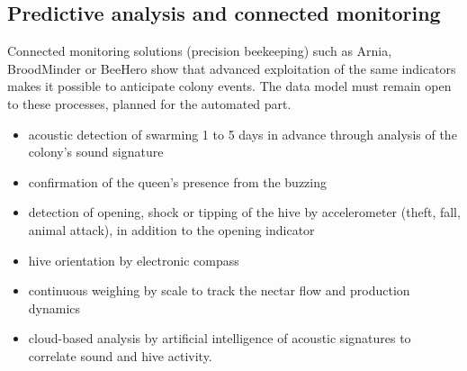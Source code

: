 \subsection{Predictive analysis and connected monitoring}
Connected monitoring solutions (precision beekeeping) such as Arnia,
BroodMinder or BeeHero show that advanced exploitation of the same indicators
makes it possible to anticipate colony events. The data model must remain open
to these processes, planned for the automated part.
\begin{itemize}
  \item acoustic detection of swarming 1 to 5 days in advance through analysis of the colony's sound signature
  \item confirmation of the queen's presence from the buzzing
  \item detection of opening, shock or tipping of the hive by accelerometer (theft, fall, animal attack), in addition to the opening indicator
  \item hive orientation by electronic compass
  \item continuous weighing by scale to track the nectar flow and production dynamics
  \item cloud-based analysis by artificial intelligence of acoustic signatures to correlate sound and hive activity.
\end{itemize}


